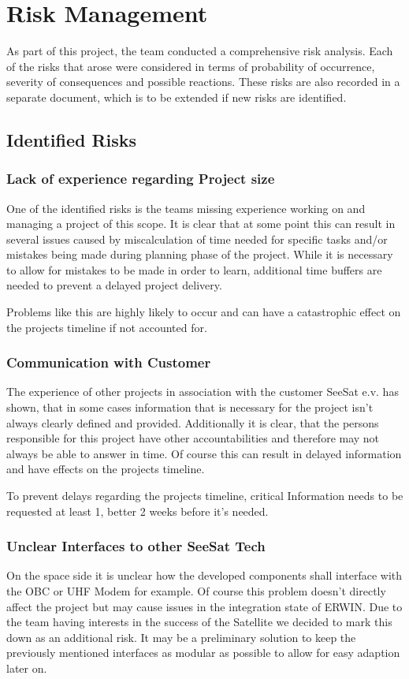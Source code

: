 \chapter{Risk Management}
\label{chp:Risk_Management}
As part of this project, the team conducted a comprehensive risk analysis. Each of the risks that arose were considered in terms of probability of occurrence, severity of consequences and possible reactions. These risks are also recorded in a separate document, which is to be extended if new risks are identified.

\section{Identified Risks}
\subsection{Lack of experience regarding Project size}
One of the identified risks is the teams missing experience working on and managing a project of this scope. It is clear that at some point this can result in several issues caused by miscalculation of time needed for specific tasks and/or mistakes being made during planning phase of the project. While it is necessary to allow for mistakes to be made in order to learn, additional time buffers are needed to prevent a delayed project delivery.

Problems like this are highly likely to occur and can have a catastrophic effect on the projects timeline if not accounted for.

\subsection{Communication with Customer}
The experience of other projects in association with the customer SeeSat e.v. has shown, that in some cases information that is necessary for the project isn’t always clearly defined and provided. Additionally it is clear, that the persons responsible for this project have other accountabilities and therefore may not always be able to answer in time. Of course this can result in delayed information and have effects on the projects timeline.

To prevent delays regarding the projects timeline, critical Information needs to be requested at least 1, better 2 weeks before it’s needed.

\subsection{Unclear Interfaces to other SeeSat Tech}
On the space side it is unclear how the developed components shall interface with the OBC or UHF Modem for example. Of course this problem doesn't directly affect the project but may cause issues in the integration state of ERWIN. Due to the team having interests in the success of the Satellite we decided to mark this down as an additional risk. It may be a preliminary solution to keep the previously mentioned interfaces as modular as possible to allow for easy adaption later on.

